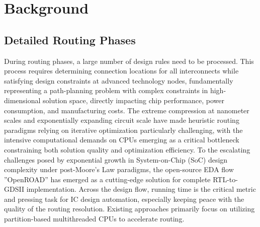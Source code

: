 \section{Background}\label{sec:background_0329}

\subsection{Detailed Routing Phases}
During routing phases, a large number of design rules need to be processed. 
This process requires determining connection locations for all interconnects while satisfying design constraints at advanced technology nodes, fundamentally representing a path-planning problem with complex constraints in high-dimensional solution space, directly impacting chip performance, power consumption, and manufacturing costs. 
The extreme compression at nanometer scales and exponentially expanding circuit scale have made heuristic routing paradigms relying on iterative optimization particularly challenging, with the intensive computational demands on CPUs emerging as a critical bottleneck constraining both solution quality and optimization efficiency.
To the escalating challenges posed by exponential growth in System-on-Chip (SoC) design complexity under post-Moore's Law paradigms, the open-source EDA flow ''OpenROAD'' has emerged as a cutting-edge solution for complete RTL-to-GDSII implementation. 
Across the design flow, running time is the critical metric and pressing task for IC design automation, especially keeping peace with the quality of the routing resolution. Existing approaches primarily focus on utilizing partition-based multithreaded CPUs to accelerate routing.

